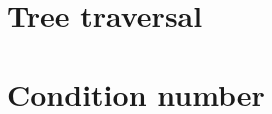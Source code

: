 \appendix

\section{Tree traversal}\label{appendix:Tree}


\section{Condition number}\label{appendix:ConNum}